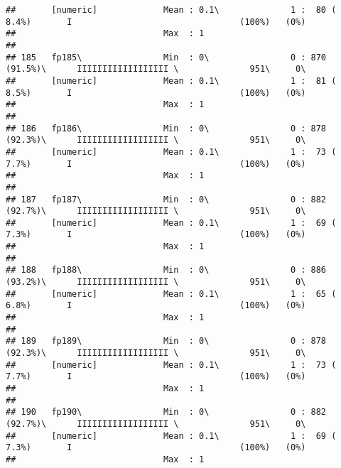 \documentclass[]{article}
\begin{document}
\begin{verbatim}
##       [numeric]             Mean : 0.1\              1 :  80 ( 8.4%)       I                                 (100%)   (0%)     
##                             Max  : 1                                                                                           
## 
## 185   fp185\                Min  : 0\                0 : 870 (91.5%)\      IIIIIIIIIIIIIIIIII \              951\     0\       
##       [numeric]             Mean : 0.1\              1 :  81 ( 8.5%)       I                                 (100%)   (0%)     
##                             Max  : 1                                                                                           
## 
## 186   fp186\                Min  : 0\                0 : 878 (92.3%)\      IIIIIIIIIIIIIIIIII \              951\     0\       
##       [numeric]             Mean : 0.1\              1 :  73 ( 7.7%)       I                                 (100%)   (0%)     
##                             Max  : 1                                                                                           
## 
## 187   fp187\                Min  : 0\                0 : 882 (92.7%)\      IIIIIIIIIIIIIIIIII \              951\     0\       
##       [numeric]             Mean : 0.1\              1 :  69 ( 7.3%)       I                                 (100%)   (0%)     
##                             Max  : 1                                                                                           
## 
## 188   fp188\                Min  : 0\                0 : 886 (93.2%)\      IIIIIIIIIIIIIIIIII \              951\     0\       
##       [numeric]             Mean : 0.1\              1 :  65 ( 6.8%)       I                                 (100%)   (0%)     
##                             Max  : 1                                                                                           
## 
## 189   fp189\                Min  : 0\                0 : 878 (92.3%)\      IIIIIIIIIIIIIIIIII \              951\     0\       
##       [numeric]             Mean : 0.1\              1 :  73 ( 7.7%)       I                                 (100%)   (0%)     
##                             Max  : 1                                                                                           
## 
## 190   fp190\                Min  : 0\                0 : 882 (92.7%)\      IIIIIIIIIIIIIIIIII \              951\     0\       
##       [numeric]             Mean : 0.1\              1 :  69 ( 7.3%)       I                                 (100%)   (0%)     
##                             Max  : 1                                                                                           

\end{verbatim}
\end{document}
